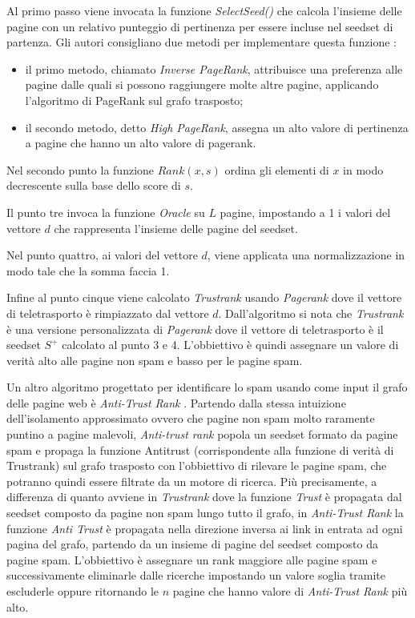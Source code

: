 Al primo passo viene invocata la funzione \textit{SelectSeed()} che calcola l'insieme delle pagine con un relativo punteggio di pertinenza per essere incluse nel seedset di partenza. Gli autori consigliano due metodi per implementare questa funzione : 
\begin{itemize}
 \item il primo metodo, chiamato \textit{Inverse PageRank}, attribuisce una preferenza alle pagine dalle quali si possono raggiungere molte altre pagine,  applicando l'algoritmo di PageRank sul grafo trasposto;
\item il secondo metodo, detto \textit{High PageRank}, assegna un alto valore di pertinenza a pagine che hanno un alto valore di pagerank.
\end{itemize}

Nel secondo punto  la funzione \(Rank(x,s)\) ordina gli elementi di \(x\) in modo decrescente sulla base dello score di \(s\). 

Il punto tre invoca la funzione \textit{Oracle} su \(L\) pagine, impostando a 1 i valori del vettore \(d\) che rappresenta l'insieme delle pagine del seedset.

Nel punto quattro, ai valori del vettore \(d\), viene applicata una normalizzazione in modo tale che la somma faccia 1. 

Infine al punto cinque viene calcolato \textit{Trustrank} usando \textit{Pagerank} dove il vettore di teletrasporto è rimpiazzato dal vettore \(d\). Dall'algoritmo si nota che \textit{Trustrank} è una versione personalizzata di \textit{Pagerank} dove il vettore di teletrasporto è il seedset \(S^+\) calcolato al punto 3 e 4. L'obbiettivo è quindi assegnare un valore di verità alto alle pagine non spam e basso per le pagine spam.


Un altro algoritmo progettato per identificare lo spam usando come input il grafo delle pagine web è \textit{Anti-Trust Rank} \cite{Krishnan06webspam}. Partendo dalla stessa intuizione dell'isolamento approssimato ovvero che pagine non spam molto raramente puntino a pagine malevoli, \textit{Anti-trust rank}  popola un seedset formato da pagine spam e propaga la funzione Antitrust (corrispondente alla funzione di verità di Trustrank) sul grafo trasposto con l’obbiettivo di rilevare le pagine spam, che potranno quindi essere filtrate da un motore di ricerca. Più precisamente, a differenza di quanto avviene in \textit{Trustrank} dove la funzione \textit{Trust} è propagata dal seedset composto da pagine non spam lungo tutto il grafo, in \textit{Anti-Trust Rank} la funzione \textit{Anti Trust} è propagata nella direzione inversa ai link in entrata ad ogni pagina del grafo, partendo da un insieme di pagine del seedset composto da pagine spam. L'obbiettivo è assegnare un rank maggiore alle pagine spam e 
successivamente eliminarle dalle ricerche impostando un valore soglia tramite escluderle oppure ritornando le \(n\) pagine che hanno valore di \textit{Anti-Trust Rank} più alto.
 
